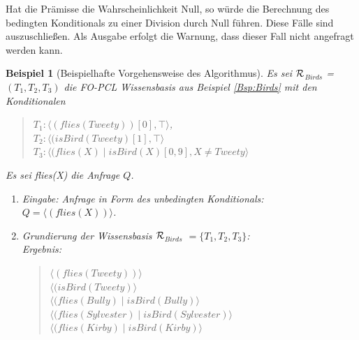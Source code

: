 \documentclass[a4paper, 11pt]{book}
\newtheorem{Bsp}{Beispiel}[section]
\begin{document}
{Hat die Prämisse die Wahrscheinlichkeit Null, so würde die Berechnung des bedingten Konditionals zu einer Division durch Null führen. Diese Fälle sind auszuschließen. Als Ausgabe erfolgt die Warnung, dass dieser Fall nicht angefragt werden kann.

\begin{Bsp}[Beispielhafte Vorgehensweise des Algorithmus]
	
	Es sei  $ \cal{R} $$_{Birds}  $ = $ (T_1, T_2, T_3)  $ die FO-PCL Wissensbasis aus Beispiel \ref{Bsp:Birds} mit den Konditionalen 
	\begin{quote}
		$ T_{1}  :  \langle (flies(Tweety))[0], \top \rangle $,\\
		$ T_{2} : \langle (isBird(Tweety) [1], \top \rangle$\\
		$ T_{3} : \langle (flies(X) \mid isBird(X)[0,9], X \neq Tweety \rangle$\\
	\end{quote}
	Es sei flies(X) die Anfrage $ Q $.
	
	\begin{enumerate}
		\item Eingabe: Anfrage in Form des unbedingten Konditionals:\\
		$ Q = \langle (flies(X)) \rangle $.
		\item Grundierung der Wissensbasis $ \cal  R$$_{Birds}  $ $ = \{T_1, T_2, T_3\} $:\\
		Ergebnis:
		\begin{quote}
			$\langle (flies(Tweety))\rangle $\\
			$ \langle (isBird(Tweety) \rangle$ \\
			$  \langle (flies(Bully) \mid isBird(Bully) \rangle$ \\ 
			$\langle (flies(Sylvester) \mid isBird(Sylvester) \rangle$\\
			$ \langle (flies(Kirby) \mid isBird(Kirby) \rangle $\\
		\end{quote}
		

\end{enumerate}
\end{Bsp}}
\end{document}
